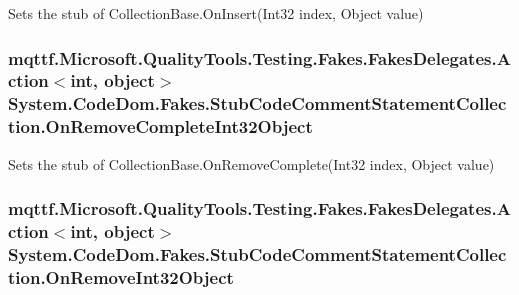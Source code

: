 Sets the stub of Collection\-Base.\-On\-Insert(\-Int32 index, Object value)

\hypertarget{class_system_1_1_code_dom_1_1_fakes_1_1_stub_code_comment_statement_collection_a3761e308863a9d5da9e13e022598be66}{
\subsubsection[{On\-Remove\-Complete\-Int32\-Object}]{\setlength{\rightskip}{0pt plus 5cm}mqttf.\-Microsoft.\-Quality\-Tools.\-Testing.\-Fakes.\-Fakes\-Delegates.\-Action$<$int, object$>$ System.\-Code\-Dom.\-Fakes.\-Stub\-Code\-Comment\-Statement\-Collection.\-On\-Remove\-Complete\-Int32\-Object}}\label{class_system_1_1_code_dom_1_1_fakes_1_1_stub_code_comment_statement_collection_a3761e308863a9d5da9e13e022598be66}


Sets the stub of Collection\-Base.\-On\-Remove\-Complete(\-Int32 index, Object value)

\hypertarget{class_system_1_1_code_dom_1_1_fakes_1_1_stub_code_comment_statement_collection_a484e23126ac708f9dfc92a79c47f730d}{
\subsubsection[{On\-Remove\-Int32\-Object}]{\setlength{\rightskip}{0pt plus 5cm}mqttf.\-Microsoft.\-Quality\-Tools.\-Testing.\-Fakes.\-Fakes\-Delegates.\-Action$<$int, object$>$ System.\-Code\-Dom.\-Fakes.\-Stub\-Code\-Comment\-Statement\-Collection.\-On\-Remove\-Int32\-Object}}\label{class_system_1_1_code_dom_1_1_fakes_1_1_stub_code_comment_statement_collection_a484e23126ac708f9dfc92a79c47f730d}


